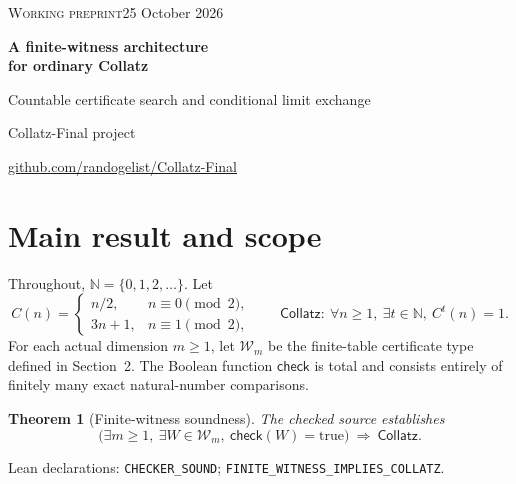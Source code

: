 \documentclass[11pt,a4paper]{article}
\newtheorem{theorem}{Theorem}[section]
\theoremstyle{definition}
\newcommand{\NN}{\mathbb N}
\newcommand{\CC}{\mathsf{Collatz}}
\newcommand{\chk}{\mathsf{check}}
\newcommand{\name}[1]{{\small\texttt{#1}}}
\newcommand{\source}[1]{\par{\footnotesize\color{ink}Lean declarations: #1.}\par}
\begin{document}
\thispagestyle{plain}
{\small\textsc{Working preprint}\hfill 25 October 2026\par}
\vspace{5mm}
{\LARGE\bfseries A finite-witness architecture\\[2pt] for ordinary Collatz\par}
\vspace{3mm}
{\large Countable certificate search and conditional limit exchange\par}
\vspace{4mm}
{\normalsize Collatz-Final project\par}
{\small\href{https://github.com/randogelist/Collatz-Final}{github.com/randogelist/Collatz-Final}\par}
\vspace{4mm}
\begin{abstract}
We document a sufficient finite-certificate route to the ordinary Collatz
conjecture. A terminating checker tests natural affine matrix interpretations
of a seven-symbol mixed binary--ternary rewriting system. The repository
proves in Lean that acceptance implies Collatz, serializes every accepted
certificate into a natural-number search space, and proves that symbolic
pruning preserves acceptance. The required project architecture is the forward
implication from accepted-witness existence; a converse is not required.
No accepted global certificate is supplied. We also describe Frontier A's
separate dyadic predecessor formulation: two explicitly identified iterated
limits commute exactly when Collatz holds. That interchange remains an open
premise, and its supporting source branch is outside the present repository
CI target.
\end{abstract}

\section{Main result and scope}
Throughout, $\NN=\{0,1,2,\ldots\}$. Let
\[
 C(n)=
 \begin{cases}
 n/2,&n\equiv0\pmod2,\\
 3n+1,&n\equiv1\pmod2,
 \end{cases}
 \qquad
 \CC:\ \forall n\ge1,\ \exists t\in\NN,\ C^t(n)=1.
\]
For each actual dimension $m\ge1$, let $\mathcal W_m$ be the finite-table
certificate type defined in Section~2. The Boolean function $\chk$ is total
and consists entirely of finitely many exact natural-number comparisons.

\begin{theorem}[Finite-witness soundness]\label{thm:main}
The checked source establishes
\[
 \boxed{\bigl(\exists m\ge1,\ \exists W\in\mathcal W_m,\
                 \chk(W)=\mathrm{true}\bigr)\ \Longrightarrow\ \CC.}
\]
\end{theorem}
\source{\name{CHECKER\_SOUND}; \name{FINITE\_WITNESS\_IMPLIES\_COLLATZ}}
\end{document}
